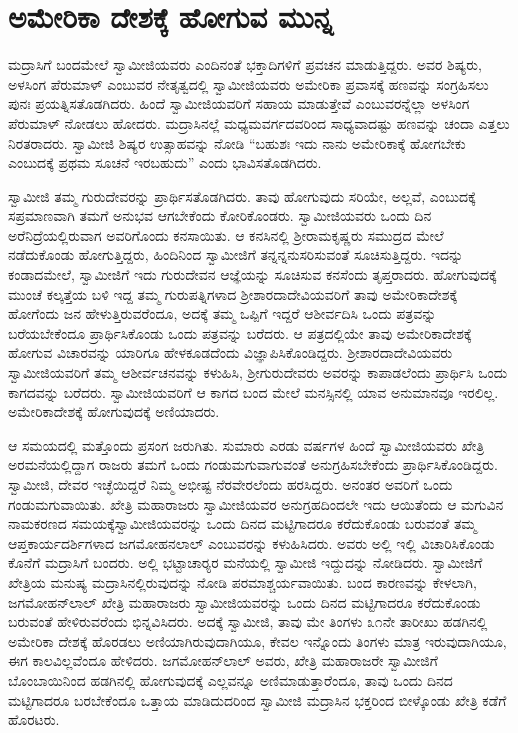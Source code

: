 
\chapter{ಅಮೇರಿಕಾ ದೇಶಕ್ಕೆ ಹೋಗುವ ಮುನ್ನ}

 ಮದ್ರಾಸಿಗೆ ಬಂದಮೇಲೆ ಸ್ವಾಮೀಜಿಯವರು ಎಂದಿನಂತೆ ಭಕ್ತಾದಿಗಳಿಗೆ ಪ್ರವಚನ ಮಾಡುತ್ತಿದ್ದರು. ಅವರ ಶಿಷ್ಯರು, ಅಳಸಿಂಗ ಪೆರುಮಾಳ್ ಎಂಬುವರ ನೇತೃತ್ವದಲ್ಲಿ ಸ್ವಾಮೀಜಿಯವರು ಅಮೇರಿಕಾ ಪ್ರವಾಸಕ್ಕೆ ಹಣವನ್ನು ಸಂಗ್ರಹಿಸಲು ಪುನಃ ಪ್ರಯತ್ನಿಸತೊಡಗಿದರು. ಹಿಂದೆ ಸ್ವಾಮೀಜಿಯವರಿಗೆ ಸಹಾಯ ಮಾಡುತ್ತೇವೆ ಎಂಬುವರನ್ನೆಲ್ಲಾ ಅಳಸಿಂಗ ಪೆರುಮಾಳ್ ನೋಡಲು ಹೋದರು. ಮದ್ರಾಸಿನಲ್ಲೆ ಮಧ್ಯಮವರ್ಗದವರಿಂದ ಸಾಧ್ಯವಾದಷ್ಟು ಹಣವನ್ನು ಚಂದಾ ಎತ್ತಲು ನಿರತರಾದರು. ಸ್ವಾಮೀಜಿ ಶಿಷ್ಯರ ಉತ್ಸಾಹವನ್ನು ನೋಡಿ “ಬಹುಶಃ ಇದು ನಾನು ಅಮೇರಿಕಾಕ್ಕೆ ಹೋಗಬೇಕು ಎಂಬುದಕ್ಕೆ ಪ್ರಥಮ ಸೂಚನೆ ಇರಬಹುದು” ಎಂದು ಭಾವಿಸತೊಡಗಿದರು. 

 ಸ್ವಾಮೀಜಿ ತಮ್ಮ ಗುರುದೇವರನ್ನು ಪ್ರಾರ್ಥಿಸತೊಡಗಿದರು. ತಾವು ಹೋಗುವುದು ಸರಿಯೇ, ಅಲ್ಲವೆ, ಎಂಬುದಕ್ಕೆ ಸಪ್ರಮಾಣವಾಗಿ ತಮಗೆ ಅನುಭವ ಆಗಬೇಕೆಂದು ಕೋರಿಕೊಂಡರು. ಸ್ವಾಮೀಜಿಯವರು ಒಂದು ದಿನ ಅರೆನಿದ್ರೆಯಲ್ಲಿರುವಾಗ ಅವರಿಗೊಂದು ಕನಸಾಯಿತು. ಆ ಕನಸಿನಲ್ಲಿ ಶ‍್ರೀರಾಮಕೃಷ್ಣರು ಸಮುದ್ರದ ಮೇಲೆ ನಡೆದುಕೊಂಡು ಹೋಗುತ್ತಿದ್ದರು, ಹಿಂದಿನಿಂದ ಸ್ವಾಮೀಜಿಗೆ ತನ್ನನ್ನನುಸರಿಸುವಂತೆ ಸೂಚಿಸುತ್ತಿದ್ದರು. ಇದನ್ನು ಕಂಡಾದಮೇಲೆ, ಸ್ವಾಮೀಜಿಗೆ ಇದು ಗುರುದೇವನ ಆಜ್ಞೆಯನ್ನು ಸೂಚಿಸುವ ಕನಸೆಂದು ತೃಪ್ತರಾದರು. ಹೋಗುವುದಕ್ಕೆ ಮುಂಚೆ ಕಲ್ಕತ್ತೆಯ ಬಳಿ ಇದ್ದ ತಮ್ಮ ಗುರುಪತ್ನಿಗಳಾದ ಶ‍್ರೀಶಾರದಾದೇವಿಯ\-ವರಿಗೆ ತಾವು ಅಮೇರಿಕಾದೇಶಕ್ಕೆ ಹೋಗೆಂದು ಜನ ಹೇಳುತ್ತಿರುವರೆಂದೂ, ಅದಕ್ಕೆ ತಮ್ಮ ಒಪ್ಪಿಗೆ ಇದ್ದರೆ ಆಶೀರ್ವದಿಸಿ ಒಂದು ಪತ್ರವನ್ನು ಬರೆಯಬೇಕೆಂದೂ ಪ್ರಾರ್ಥಿಸಿಕೊಂಡು ಒಂದು ಪತ್ರವನ್ನು ಬರೆದರು. ಆ ಪತ್ರದಲ್ಲಿಯೇ ತಾವು ಅಮೇರಿಕಾದೇಶಕ್ಕೆ ಹೋಗುವ ವಿಚಾರವನ್ನು ಯಾರಿಗೂ ಹೇಳಕೂಡದೆಂದು ವಿಜ್ಞಾಪಿಸಿಕೊಂಡಿದ್ದರು. ಶ‍್ರೀಶಾರದಾದೇವಿಯವರು ಸ್ವಾಮೀಜಿಯವರಿಗೆ ತಮ್ಮ ಆಶೀರ್ವಚನವನ್ನು ಕಳುಹಿಸಿ, ಶ‍್ರೀಗುರುದೇವರು ಅವರನ್ನು ಕಾಪಾಡಲೆಂದು ಪ್ರಾರ್ಥಿಸಿ ಒಂದು ಕಾಗದವನ್ನು ಬರೆದರು. ಸ್ವಾಮೀಜಿಯವರಿಗೆ ಆ ಕಾಗದ ಬಂದ ಮೇಲೆ ಮನಸ್ಸಿನಲ್ಲಿ ಯಾವ ಅನುಮಾನವೂ ಇರಲಿಲ್ಲ. ಅಮೇರಿಕಾದೇಶಕ್ಕೆ ಹೋಗುವುದಕ್ಕೆ ಅಣಿಯಾದರು. 

 ಆ ಸಮಯದಲ್ಲಿ ಮತ್ತೊಂದು ಪ್ರಸಂಗ ಜರುಗಿತು. ಸುಮಾರು ಎರಡು ವರ್ಷಗಳ ಹಿಂದೆ ಸ್ವಾಮೀಜಿಯವರು ಖೇತ್ರಿ ಅರಮನೆಯಲ್ಲಿದ್ದಾಗ ರಾಜರು ತಮಗೆ ಒಂದು ಗಂಡುಮಗುವಾಗುವಂತೆ ಅನುಗ್ರಹಿಸಬೇಕೆಂದು ಪ್ರಾರ್ಥಿಸಿಕೊಂಡಿದ್ದರು. ಸ್ವಾಮೀಜಿ, ದೇವರ ಇಚ್ಛೆಯಿದ್ದರೆ ನಿಮ್ಮ ಅಭೀಷ್ಟ ನೆರವೇರಲೆಂದು ಹರಸಿದ್ದರು. ಅನಂತರ ಅವರಿಗೆ ಒಂದು ಗಂಡುಮಗುವಾಯಿತು. ಖೇತ್ರಿ ಮಹಾರಾಜರು ಸ್ವಾಮೀಜಿಯವರ ಅನುಗ್ರಹದಿಂದಲೇ ಇದು ಆಯಿತೆಂದು ಆ ಮಗುವಿನ ನಾಮಕರಣದ ಸಮಯಕ್ಕೆ\break ಸ್ವಾಮೀಜಿಯವರನ್ನು ಒಂದು ದಿನದ ಮಟ್ಟಿಗಾದರೂ ಕರೆದುಕೊಂಡು ಬರುವಂತೆ ತಮ್ಮ ಆಪ್ತಕಾರ್ಯದರ್ಶಿಗಳಾದ ಜಗಮೋಹನಲಾಲ್ ಎಂಬುವರನ್ನು ಕಳುಹಿಸಿದರು. ಅವರು ಅಲ್ಲಿ ಇಲ್ಲಿ ವಿಚಾರಿಸಿಕೊಂಡು ಕೊನೆಗೆ ಮದ್ರಾಸಿಗೆ ಬಂದರು. ಅಲ್ಲಿ ಭಟ್ಟಾಚಾರ‍್ಯರ ಮನೆಯಲ್ಲಿ ಸ್ವಾಮೀಜಿ ಇದ್ದುದನ್ನು ನೋಡಿದರು. ಸ್ವಾಮೀಜಿಗೆ ಖೇತ್ರಿಯ ಮನುಷ್ಯ ಮದ್ರಾಸಿನಲ್ಲಿರುವುದನ್ನು ನೋಡಿ ಪರಮಾಶ್ಚರ್ಯವಾಯಿತು. ಬಂದ ಕಾರಣವನ್ನು ಕೇಳಲಾಗಿ, ಜಗಮೋಹನ್‍ಲಾಲ್ ಖೇತ್ರಿ ಮಹಾರಾಜರು ಸ್ವಾಮೀಜಿಯವರನ್ನು ಒಂದು ದಿನದ ಮಟ್ಟಿಗಾದರೂ ಕರೆದುಕೊಂಡು ಬರುವಂತೆ ಹೇಳಿರುವರೆಂದು ಭಿನ್ನವಿಸಿದರು. ಅದಕ್ಕೆ ಸ್ವಾಮೀಜಿ, ತಾವು ಮೇ ತಿಂಗಳು ೩೧ನೇ ತಾರೀಖು ಹಡಗಿನಲ್ಲಿ ಅಮೇರಿಕಾ ದೇಶಕ್ಕೆ ಹೊರಡಲು ಅಣಿಯಾಗಿರುವುದಾಗಿಯೂ, ಕೇವಲ ಇನ್ನೊಂದು ತಿಂಗಳು ಮಾತ್ರ ಇರುವುದಾಗಿಯೂ, ಈಗ ಕಾಲವಿಲ್ಲವೆಂದೂ ಹೇಳಿದರು. ಜಗಮೋಹನ್‍ಲಾಲ್ ಅವರು, ಖೇತ್ರಿ ಮಹಾರಾಜರೇ ಸ್ವಾಮೀಜಿಗೆ ಬೊಂಬಾಯಿನಿಂದ ಹಡಗಿನಲ್ಲಿ ಹೋಗುವುದಕ್ಕೆ ಎಲ್ಲವನ್ನೂ ಅಣಿಮಾಡುತ್ತಾರೆಂದೂ, ತಾವು ಒಂದು ದಿನದ ಮಟ್ಟಿಗಾದರೂ ಬರಬೇಕೆಂದೂ ಒತ್ತಾಯ ಮಾಡಿದುದರಿಂದ ಸ್ವಾಮೀಜಿ ಮದ್ರಾಸಿನ ಭಕ್ತರಿಂದ ಬೀಳ್ಕೊಂಡು ಖೇತ್ರಿ ಕಡೆಗೆ ಹೊರಟರು. 

